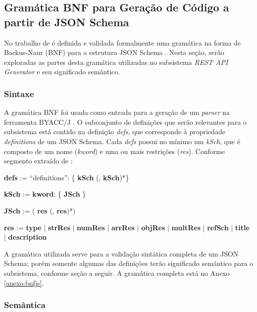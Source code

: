 
\subsection{Gramática BNF para Geração de Código a partir de JSON Schema}
\label{sec:bnf}

No trabalho de  é definida e validada formalmente uma gramática na forma de Backus-Naur (BNF) para a estrutura JSON Schema \cite{GALIEGUE:2013}. Nesta seção, serão exploradas as partes desta gramática utilizadas no subsistema \textit{REST API Generator} e seu significado semântico.


\subsubsection{Sintaxe}
A gramática BNF foi usada como entrada para a geração de um \textit{parser} na ferramenta BYACC/J \cite{BYACCJ}. O subconjunto de definições que serão relevantes para o subsistema está contido na definição \textit{defs}, que corresponde à propriedade \textit{definitions} de um JSON Schema. Cada \textit{defs} possui no mínimo um \textit{kSch}, que é composto de um nome (\textit{kword}) e uma ou mais restrições (\textit{res}). Conforme segmento extraído de \cite{PEZOA:2016}:

\begin{algorithmic}
    \item \textbf{defs} := ``definitions'': \{ \textbf{kSch} (, \textbf{kSch})*\}
    \item \textbf{kSch} := \textbf{kword}: \{ \textbf{JSch} \}
    \item \textbf{JSch} := ( \textbf{res} (, \textbf{res})*)
    \item \textbf{res} := \textbf{type} | \textbf{strRes} | \textbf{numRes} | \textbf{arrRes} | \textbf{objRes} | \textbf{multRes} | \textbf{refSch} | \textbf{title} | \textbf{description}
\end{algorithmic}

A gramática utilizada serve para a validação sintática completa de um JSON Schema; porém somente algumas das definições terão significado semântico para o subsistema, conforme seção a seguir. A gramática completa está no Anexo \ref{anexo:bnfjs}.

\subsubsection{Semântica}

